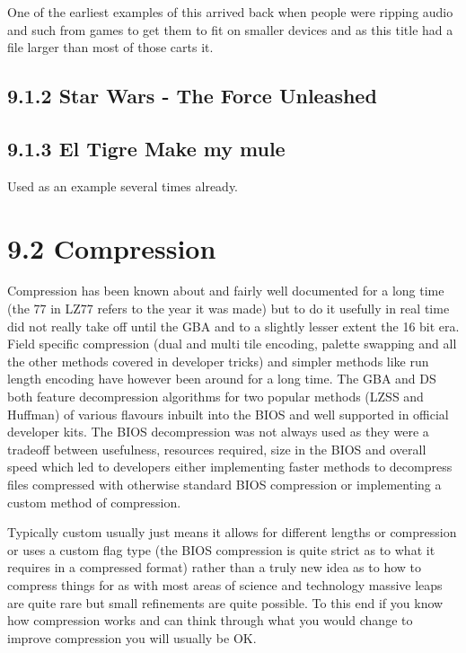 \documentclass[
]{book}
\begin{document}
One of the earliest examples of this arrived back when people were ripping audio and such from games to get them to fit on smaller devices and as this title had a file larger than most of those carts it.

\hypertarget{star-wars---the-force-unleashed}{%
\subsection{9.1.2 Star Wars - The Force Unleashed}\label{star-wars---the-force-unleashed}}

\hypertarget{el-tigre-make-my-mule}{%
\subsection{9.1.3 El Tigre Make my mule}\label{el-tigre-make-my-mule}}

Used as an example several times already.

\hypertarget{compression-2}{%
\section{9.2 Compression}\label{compression-2}}

Compression has been known about and fairly well documented for a long time (the 77 in LZ77 refers to the year it was made) but to do it usefully in real time did not really take off until the GBA and to a slightly lesser extent the 16 bit era. Field specific compression (dual and multi tile encoding, palette swapping and all the other methods covered in developer tricks) and simpler methods like run length encoding have however been around for a long time. The GBA and DS both feature decompression algorithms for two popular methods (LZSS and Huffman) of various flavours inbuilt into the BIOS and well supported in official developer kits. The BIOS decompression was not always used as they were a tradeoff between usefulness, resources required, size in the BIOS and overall speed which led to developers either implementing faster methods to decompress files compressed with otherwise standard BIOS compression or implementing a custom method of compression.

Typically custom usually just means it allows for different lengths or compression or uses a custom flag type (the BIOS compression is quite strict as to what it requires in a compressed format) rather than a truly new idea as to how to compress things for as with most areas of science and technology massive leaps are quite rare but small refinements are quite possible. To this end if you know how compression works and can think through what you would change to improve compression you will usually be OK.
\end{document}

